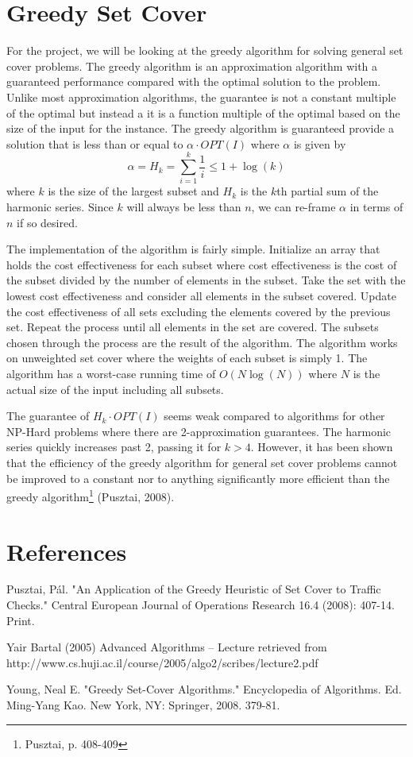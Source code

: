 \documentclass[12pt]{report}
\begin{document}
\section{Greedy Set Cover}
For the project, we will be looking at the greedy algorithm for solving general set cover problems. The greedy algorithm is an approximation algorithm with a guaranteed performance compared with the optimal solution to the problem. Unlike most approximation algorithms, the guarantee is not a constant multiple of the optimal but instead a it is a function multiple of the optimal based on the size of the input for the instance. The greedy algorithm is guaranteed provide a solution that is less than or equal to $\alpha \cdot OPT(I)$ where $\alpha$ is given by $$\alpha = H_k = \sum_{i=1}^k \frac{1}{i}\leq 1+\log(k)$$ where $k$ is the size of the largest subset and $H_k$ is the $k$th partial sum of the harmonic series. Since $k$ will always be less than $n$, we can re-frame $\alpha$ in terms of $n$ if so desired.

The implementation of the algorithm is fairly simple. Initialize an array that holds the cost effectiveness for each subset where cost effectiveness is the cost of the subset divided by the number of elements in the subset. Take the set with the lowest cost effectiveness and consider all elements in the subset covered. Update the cost effectiveness of all sets excluding the elements covered by the previous set. Repeat the process until all elements in the set are covered. The subsets chosen through the process are the result of the algorithm. The algorithm works on unweighted set cover where the weights of each subset is simply 1. The algorithm has a worst-case running time of $O(N\log(N))$ where $N$ is the actual size of the input including all subsets.

The guarantee of $H_k\cdot OPT(I)$ seems weak compared to algorithms for other NP-Hard problems where there are 2-approximation guarantees. The harmonic series quickly increases past 2, passing it for $k>4$. However, it has been shown that the efficiency of the greedy algorithm for general set cover problems cannot be improved to a constant nor to anything significantly more efficient than the greedy algorithm\footnote{Pusztai, p. 408-409} (Pusztai, 2008).

\section{References}
Pusztai, Pál. "An Application of the Greedy Heuristic of Set Cover to Traffic Checks." Central European Journal of Operations Research 16.4 (2008): 407-14. Print.

Yair Bartal (2005) Advanced Algorithms – Lecture retrieved from http://www.cs.huji.ac.il/course/2005/algo2/scribes/lecture2.pdf

Young, Neal E. "Greedy Set-Cover Algorithms." Encyclopedia of Algorithms. Ed. Ming-Yang Kao. New York, NY: Springer, 2008. 379-81.
\end{document}
